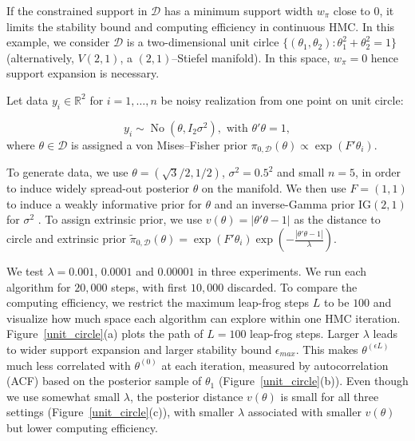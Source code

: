 \documentclass[10pt]{article}
\newcommand{\mc}[1]{\mathcal{#1}}
\DeclareMathOperator{\No}{No}
\DeclareMathOperator{\1}{\mathbbm{1}}
\begin{document}
If the constrained support in $\mc D$ has a minimum support width $w_\pi$ close to $0$, it limits the stability bound and computing efficiency in continuous HMC. In this example, we consider $\mc D$ is a two-dimensional unit cirlce $\{(\theta_1,\theta_2):\theta_1^2+\theta_2^2=1\}$ (alternatively, $V(2,1)$, a $(2,1)$--Stiefel manifold). In this space, $w_\pi =0$ hence support expansion is necessary.

Let data $y_i\in \mathbb{R}^2$ for $i=1,\ldots,n$  be noisy realization from one point on unit circle:

$$y_i\sim \No(\theta, I_2\sigma^2),\text{ with } \theta'\theta=1,$$
where $\theta \in \mc D$ is assigned a von Mises--Fisher prior $\pi_{0,\mc D}(\theta) \propto \exp(F'\theta_i)$.

 To generate data, we use $\theta= (\sqrt 3/2, 1/2)$, $\sigma^2=0.5^2$ and small $n=5$, in order to induce widely spread-out posterior $\theta$ on the manifold. We then use $F=(1,1)$ to induce a weakly informative prior for $\theta$ and an inverse-Gamma prior $\text{IG}(2,1)$ for $\sigma^2$ . To assign extrinsic prior, we use $v(\theta)=|\theta'\theta -1|$ as the distance to circle and extrinsic prior $\tilde\pi_{0,\mc D}(\theta)= \exp(F'\theta_i) \exp(-\frac{|\theta'\theta -1|}{\lambda})$.

We test $\lambda = 0.001$, $0.0001$ and $0.00001$ in three experiments. We run each algorithm for $20,000$ steps, with first $10,000$ discarded. To compare the computing efficiency, we restrict the maximum leap-frog steps $L$ to be $100$ and visualize how much space each algorithm can explore within one HMC iteration. Figure~\ref{unit_circle}(a) plots the path of $L=100$ leap-frog steps. Larger $\lambda$ leads to wider support expansion and larger stability bound $\epsilon_{max}$. This makes $\theta^{(\epsilon L)}$  much less correlated with $\theta^{(0)}$ at each iteration, measured by autocorrelation (ACF) based on the posterior sample of $\theta_1$ (Figure~\ref{unit_circle}(b)). Even though we use somewhat small $\lambda$, the posterior distance $v(\theta)$ is small for all three settings (Figure~\ref{unit_circle}(c)), with smaller $\lambda$ associated with smaller $v(\theta)$ but lower computing efficiency.
\end{document}
